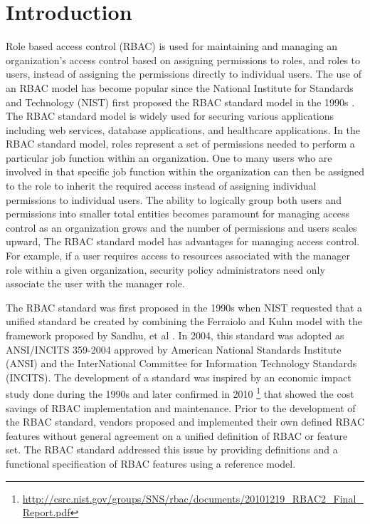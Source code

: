 \section{Introduction} \label{sec:introduction}

Role based access control (RBAC) is used for maintaining and managing an organization's 
access control based on assigning permissions to roles, and roles to users, instead of 
assigning the permissions directly to individual users. 
The use of an RBAC model has become popular since the National Institute for Standards and Technology (NIST) 
first proposed the RBAC standard model in the 1990s \cite{o20102010}. The RBAC standard model is widely used for securing 
various applications including web services, database applications, and healthcare applications. 
In the RBAC standard model, roles represent a set of permissions needed to perform a particular job function within an organization.  
One to many users who are involved in that specific job function within the organization can then be 
assigned to the role to inherit the required access instead of assigning individual permissions to individual users. 
The ability to logically group both users and permissions into smaller total entities becomes paramount for managing access control
as an organization grows and the number of permissions and users scales upward, 
The RBAC standard model has advantages for managing access control. For example, if a user requires access to resources 
associated with the manager role within a given organization, security policy administrators need only associate the user with the manager role.

The RBAC standard was first proposed in the 1990s when NIST 
requested that a unified standard be created by combining the Ferraiolo and Kuhn model \cite{ferraiolokuhn} with the framework 
proposed by Sandhu, et al \cite{sandhu1996role}.  
In 2004, this standard was adopted as ANSI/INCITS 359-2004 approved by American National Standards Institute (ANSI) and the InterNational Committee for Information Technology Standards (INCITS). 
The development of a standard was inspired by an economic impact study done during the 1990s and later confirmed in 2010 \footnote{\url{http://csrc.nist.gov/groups/SNS/rbac/documents/20101219_RBAC2_Final_Report.pdf}} that showed the cost savings of RBAC implementation and maintenance. 
Prior to the development of the RBAC standard, vendors proposed and implemented their own defined RBAC features without general agreement on a unified definition of RBAC or feature set. 
The RBAC standard addressed this issue by providing definitions and a functional specification of RBAC features using a reference model.

